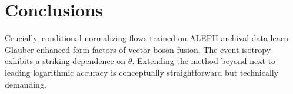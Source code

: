 \section{Conclusions}\label{sec:conclusions}

Crucially, conditional normalizing flows trained on ALEPH archival data
learn Glauber-enhanced form factors of vector boson fusion. The event
isotropy exhibits a striking dependence on $\theta$. Extending the
method beyond next-to-leading logarithmic accuracy is conceptually
straightforward but technically demanding.

